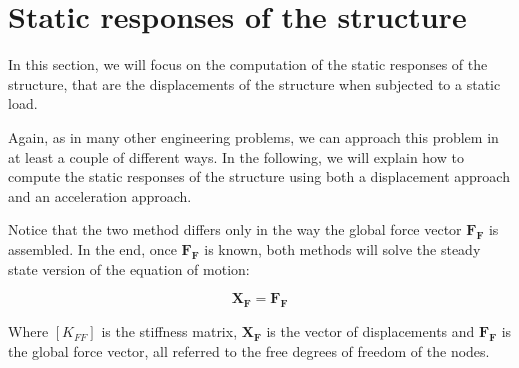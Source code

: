\section{Static responses of the structure}
\label{sec:static_responses}

In this section, we will focus on the computation of the static responses of the structure, that are the displacements of the structure when subjected to a static load.

Again, as in many other engineering problems, we can approach this problem in at least a couple of different ways.
In the following, we will explain how to compute the static responses of the structure using both a displacement approach and an acceleration approach.

Notice that the two method differs only in the way the global force vector $\mathbf{F_F}$ is assembled.
In the end, once $\mathbf{F_F}$ is known, both methods will solve the steady state version of the equation of motion:

\begin{equation}
    [K_{FF}] \mathbf{X_F} = \mathbf{F_F}
    \label{eq:static_responses}
\end{equation}

Where $[K_{FF}]$ is the stiffness matrix, $\mathbf{X_F}$ is the vector of displacements and $\mathbf{F_F}$ is the global force vector, all referred to the free degrees of freedom of the nodes.




